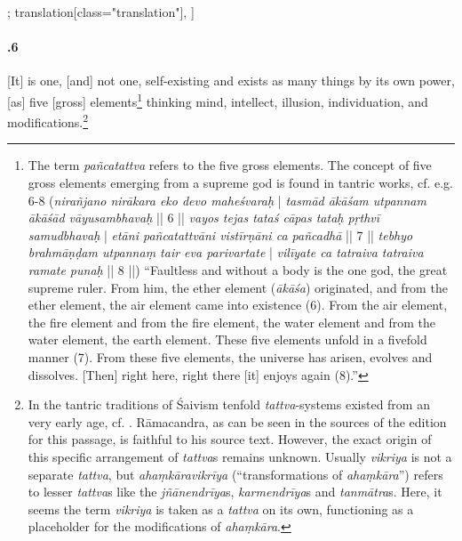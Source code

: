 \begin{alignment}[
  texts=edition[class="edition"];
  translation[class="translation"],
  ]
\begin{translation}
\begin{tlate}[21_6]
     \paragraph{.6} [It] is one, [and] not one, self-existing and exists as many things by its own power, [as] five [gross] elements\footnote{The term \textit{pañcatattva} refers to the five gross elements. The concept of five gross elements emerging from a supreme god is found in tantric works, cf. e.g.  6-8 (\textit{nirañjano nirākara eko devo maheśvaraḥ} | \textit{tasmād ākāśam utpannam ākāśād vāyusambhavaḥ} || 6 || \textit{vayos tejas tataś cāpas tataḥ pṛthvī samudbhavaḥ} | \textit{etāni pañcatattvāni vistīrṇāni ca pañcadhā} || 7 || \textit{tebhyo brahmāṇḍam utpannaṃ tair eva parivartate} | \textit{vilīyate ca tatraiva tatraiva ramate punaḥ} || 8 ||) “Faultless and without a body is the one god, the great supreme ruler. From him, the ether element (\textit{ākāśa}) originated, and from the ether element, the air element came into existence (6). From the air element, the fire element and from the fire element, the water element and from the water element, the earth element. These five elements unfold in a fivefold manner (7). From these five elements, the universe has arisen, evolves and dissolves. [Then] right here, right there [it] enjoys again (8).” } thinking mind, intellect, illusion, individuation, and modifications.\footnote{In the tantric traditions of Śaivism tenfold \textit{tattva}-systems existed from an very early age, cf. \citeauthor[2016:82-85]{goodall2016}. Rāmacandra, as can be seen in the sources of the edition for this passage, is faithful to his source text. However, the exact origin of this specific arrangement of \textit{tattva}s remains unknown. Usually \textit{vikriya} is not a separate \textit{tattva}, but \textit{ahaṃkāravikrīya} (“transformations of \textit{ahaṃkāra}”) refers to lesser \textit{tattva}s like the \textit{jñānendrīya}s, \textit{karmendrīya}s and \textit{tanmātra}s. Here, it seems the term \textit{vikriya} is taken as a \textit{tattva} on its own, functioning as a placeholder for the modifications of \textit{ahaṃkāra}.}
   \end{tlate}
   \begin{tlate}[21_7]

\end{tlate}
\end{translation}
\end{alignment}
